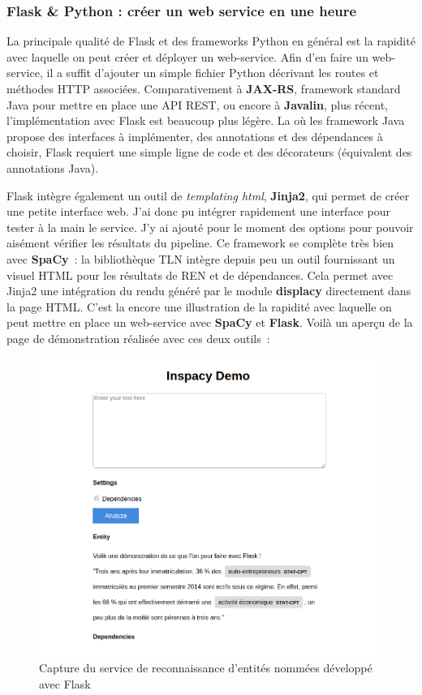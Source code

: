 \subsubsection*{Flask \& Python : créer un web service en une heure}
La principale qualité de Flask et des frameworks Python en général est la rapidité avec laquelle on peut créer et déployer un web-service. Afin d'en faire un web-service, il a suffit d'ajouter un simple fichier Python décrivant les routes et méthodes HTTP associées. Comparativement à \textbf{JAX-RS}, framework standard Java pour mettre en place une API REST, ou encore à \textbf{Javalin}, plus récent, l'implémentation avec Flask est beaucoup plus légère. La où les framework Java propose des interfaces à implémenter, des annotations et des dépendances à choisir, Flask requiert une simple ligne de code et des décorateurs (équivalent des annotations Java).
\newline

Flask intègre également un outil de \textit{templating html}, \textbf{Jinja2}, qui permet de créer une petite interface web. J'ai donc pu intégrer rapidement une interface pour tester à la main le service. J'y ai ajouté pour le moment des options pour pouvoir aisément vérifier les résultats du pipeline. Ce framework se complète très bien avec \textbf{SpaCy}~: la bibliothèque TLN intègre depuis peu un outil fournissant un visuel HTML pour les résultats de REN et de dépendances. Cela permet avec Jinja2 une intégration du rendu généré par le module \textbf{displacy} directement dans la page HTML. C'est la encore une illustration de la rapidité avec laquelle on peut mettre en place un web-service avec \textbf{SpaCy} et \textbf{Flask}. Voilà un aperçu de la page de démonstration réalisée avec ces deux outils~:
\begin{figure}[H]
    \centering
    \includegraphics[scale=0.6]{images/inspaCy-demo.png}
    \caption{Capture du service de reconnaissance d'entités nommées développé avec Flask}
    \label{fig:demo-inspaCy}
\end{figure}

